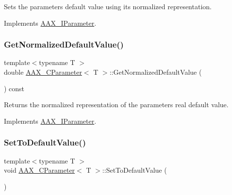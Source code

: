 Sets the parameter\textquotesingle{}s default value using its normalized representation. 



Implements \mbox{\hyperlink{a01857_a42ce03269f84f46d5af70ac198727052}{A\+A\+X\+\_\+\+I\+Parameter}}.

\mbox{\label{a01537_a9897b66c035ec5ae306f641728769abb}} 
\subsubsection{\texorpdfstring{GetNormalizedDefaultValue()}{GetNormalizedDefaultValue()}}
{\footnotesize\ttfamily template$<$typename T $>$ \\
double \mbox{\hyperlink{a01537}{A\+A\+X\+\_\+\+C\+Parameter}}$<$ T $>$\+::Get\+Normalized\+Default\+Value (\begin{DoxyParamCaption}{ }\end{DoxyParamCaption}) const\hspace{0.3cm}{\ttfamily [virtual]}}



Returns the normalized representation of the parameter\textquotesingle{}s real default value. 



Implements \mbox{\hyperlink{a01857_a6e645417c9296b3dd12a95cfb45babb9}{A\+A\+X\+\_\+\+I\+Parameter}}.

\mbox{\label{a01537_a9ae87f0a8655c68ac7c59bec3f476c48}} 
\subsubsection{\texorpdfstring{SetToDefaultValue()}{SetToDefaultValue()}}
{\footnotesize\ttfamily template$<$typename T $>$ \\
void \mbox{\hyperlink{a01537}{A\+A\+X\+\_\+\+C\+Parameter}}$<$ T $>$\+::Set\+To\+Default\+Value (\begin{DoxyParamCaption}{ }\end{DoxyParamCaption})\hspace{0.3cm}{\ttfamily [virtual]}}



